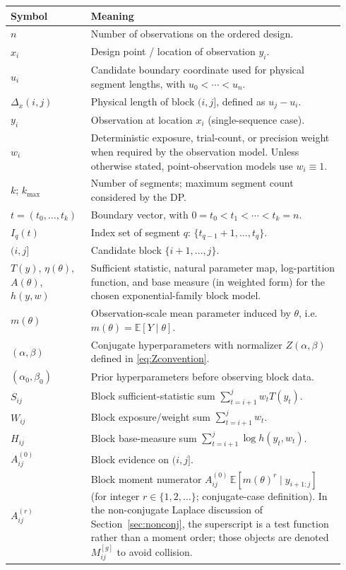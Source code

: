 \begin{longtable}{@{}p{0.22\linewidth}p{0.72\linewidth}@{}}
\toprule
\textbf{Symbol} & \textbf{Meaning} \\
\midrule
$n$ & Number of observations on the ordered design. \\
$x_i$ & Design point / location of observation $y_i$. \\
$u_i$ & Candidate boundary coordinate used for physical segment lengths, with $u_0<\cdots<u_n$. \\
$\Delta_x(i,j)$ & Physical length of block $(i,j]$, defined as $u_j-u_i$. \\
$y_i$ & Observation at location $x_i$ (single-sequence case). \\
$w_i$ & Deterministic exposure, trial-count, or precision weight when required by the observation model. Unless otherwise stated, point-observation models use $w_i\equiv 1$. \\
\midrule
$k$; $k_{\max}$ & Number of segments; maximum segment count considered by the DP. \\
$t=(t_0,\dots,t_k)$ & Boundary vector, with $0=t_0<t_1<\cdots<t_k=n$. \\
$I_q(t)$ & Index set of segment $q$: $\{t_{q-1}+1,\dots,t_q\}$. \\
$(i,j]$ & Candidate block $\{i+1,\dots,j\}$. \\
\midrule
$T(y)$, $\eta(\theta)$, $A(\theta)$, $h(y,w)$ & Sufficient statistic, natural parameter map, log-partition function, and base measure (in weighted form) for the chosen exponential-family block model. \\
$m(\theta)$ & Observation-scale mean parameter induced by $\theta$, i.e. $m(\theta)=\mathbb{E}[Y\mid\theta]$. \\
\midrule
$(\alpha,\beta)$ & Conjugate hyperparameters with normalizer $Z(\alpha,\beta)$ defined in \eqref{eq:Zconvention}. \\
$(\alpha_0,\beta_0)$ & Prior hyperparameters before observing block data. \\
\midrule
$S_{ij}$ & Block sufficient-statistic sum $\sum_{t=i+1}^j w_t T(y_t)$. \\
$W_{ij}$ & Block exposure/weight sum $\sum_{t=i+1}^j w_t$. \\
$H_{ij}$ & Block base-measure sum $\sum_{t=i+1}^j \log h(y_t,w_t)$. \\
$A^{(0)}_{ij}$ & Block evidence on $(i,j]$. \\
$A^{(r)}_{ij}$ & Block moment numerator $A^{(0)}_{ij}\,\mathbb{E}[m(\theta)^r\mid y_{i+1:j}]$ (for integer $r\in\{1,2,\dots\}$; conjugate-case definition). In the non-conjugate Laplace discussion of Section~\ref{sec:nonconj}, the superscript is a test function rather than a moment order; those objects are denoted $M^{[g]}_{ij}$ to avoid collision. \\

\end{longtable}
